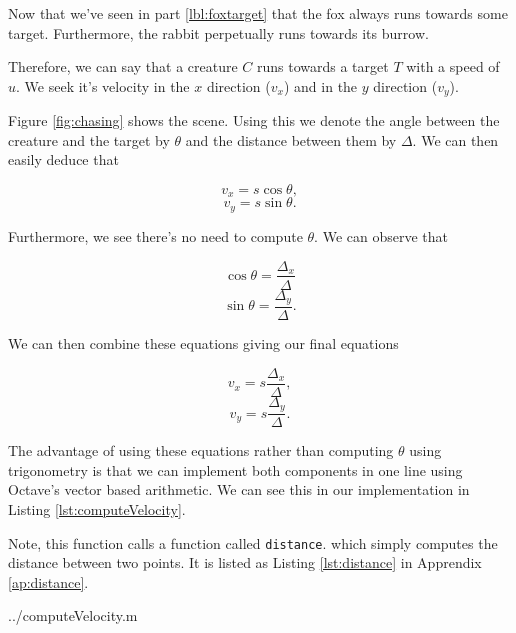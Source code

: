 Now that we've seen in part \ref{lbl:foxtarget} that the fox always runs towards some target. Furthermore, the rabbit perpetually runs towards its burrow. 

Therefore, we can say that a creature $C$ runs towards a target $T$ with a speed of $u$. We seek it's velocity in the $x$ direction ($v_x$) and in the $y$ direction ($v_y$).





Figure \ref{fig:chasing} shows the scene. Using this we denote the angle between the creature and the target by $\theta$ and the distance between them by $\Delta$. We can then easily deduce that

$$ v_x = s\cos{\theta}, $$
$$ v_y = s\sin{\theta}. $$

Furthermore, we see there's no need to compute $\theta$. We can observe that 

$$ \cos{\theta} = \frac{\Delta_x}{\Delta}$$
$$ \sin{\theta} = \frac{\Delta_y}{\Delta}.$$

We can then combine these equations giving our final equations

$$ v_x = s \frac{\Delta_x}{\Delta},$$
$$ v_y = s \frac{\Delta_y}{\Delta}.$$

The advantage of using these equations rather than computing $\theta$ using trigonometry is that we can implement both components in one line using Octave's vector based arithmetic. We can see this in our implementation in Listing \ref{lst:computeVelocity}.

Note, this function calls a function called \texttt{distance}. which simply computes the distance between two points. It is listed as Listing \ref{lst:distance} in Apprendix \ref{ap:distance}.

  {../computeVelocity.m}
